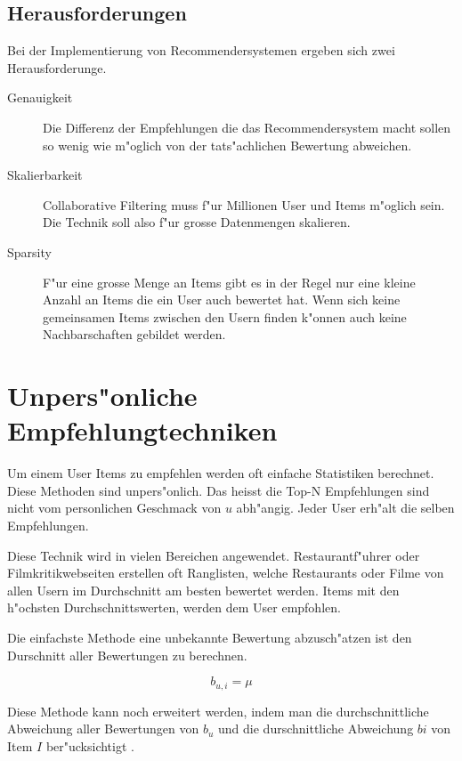 \documentclass[a4paper, 11pt]{article}
\begin{document}
\subsection{Herausforderungen}
\label{sec:challenges}

Bei der Implementierung von Recommendersystemen ergeben sich zwei Herausforderunge.

\begin{description}
\item[Genauigkeit] Die Differenz der Empfehlungen die das Recommendersystem macht sollen so wenig wie m"oglich von der tats"achlichen Bewertung abweichen.
\item[Skalierbarkeit] 
Collaborative Filtering muss f"ur Millionen User und Items m"oglich sein. Die Technik soll also f"ur grosse Datenmengen skalieren.
\item[Sparsity] F"ur eine grosse Menge an Items gibt es in der Regel nur eine kleine Anzahl an Items die ein User auch bewertet hat. Wenn sich keine gemeinsamen Items zwischen den Usern finden k"onnen auch keine Nachbarschaften gebildet werden.
\end{description}


\section{Unpers"onliche Empfehlungtechniken}
\label{sec:simple}

Um einem User Items zu empfehlen werden oft einfache Statistiken berechnet. Diese Methoden sind unpers"onlich. Das heisst die Top-N Empfehlungen sind nicht vom personlichen Geschmack von $u$ abh"angig. Jeder User erh"alt die selben Empfehlungen. 

Diese Technik wird in vielen Bereichen angewendet. Restaurantf"uhrer oder Filmkritikwebseiten erstellen oft Ranglisten, welche Restaurants oder Filme von allen Usern im Durchschnitt am besten bewertet werden. Items mit den h"ochsten Durchschnittswerten, werden dem User empfohlen.

Die einfachste Methode eine unbekannte Bewertung abzusch"atzen ist den Durschnitt aller Bewertungen zu berechnen.

\begin{equation}
  \label{eq:avg}
  b_{u,i} = \mu
\end{equation}

Diese Methode kann noch erweitert werden, indem man die durchschnittliche Abweichung aller Bewertungen von $b_u$ und die durschnittliche Abweichung $bi$ von Item $I$ ber"ucksichtigt \cite{jannach11}.
\end{document}

